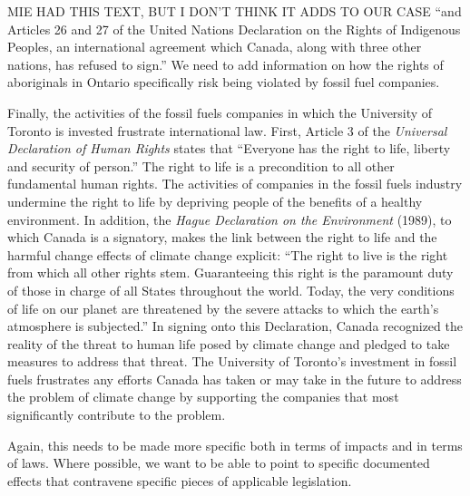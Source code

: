 \begin{vcom}
	MIE HAD THIS TEXT, BUT I DON'T THINK IT ADDS TO OUR CASE ``and Articles 26 and 27 of the United Nations Declaration on the Rights of Indigenous Peoples, an international agreement which Canada, along with three other nations, has refused to sign.'' We need to add information on how the rights of aboriginals in Ontario specifically risk being violated by fossil fuel companies.
\end{vcom}



Finally, the activities of the fossil fuels companies in which the University of Toronto is invested frustrate international law.  
First, Article 3 of the \emph{Universal Declaration of Human Rights} states that ``Everyone has the right to life, liberty and security of person.''   
The right to life is a precondition to all other fundamental human rights.  
The activities of companies in the fossil fuels industry undermine the right to life by depriving people of the benefits of a healthy environment.  
In addition, the \emph{Hague Declaration on the Environment} (1989), to which Canada is a signatory, makes the link between the right to life and the harmful change effects of climate change explicit: ``The right to live is the right from which all other rights stem.  
Guaranteeing this right is the paramount duty of those in charge of all States throughout the world.  
Today, the very conditions of life on our planet are threatened by the severe attacks to which the earth’s atmosphere is subjected.''   
In signing onto this Declaration, Canada recognized the reality of the threat to human life posed by climate change and pledged to take measures to address that threat.  
The University of Toronto’s investment in fossil fuels frustrates any efforts Canada has taken or may take in the future to address the problem of climate change by supporting the companies that most significantly contribute to the problem.	

\begin{vcom}
	Again, this needs to be made more specific both in terms of impacts and in terms of laws. Where possible, we want to be able to point to specific documented effects that contravene specific pieces of applicable legislation.
\end{vcom}


